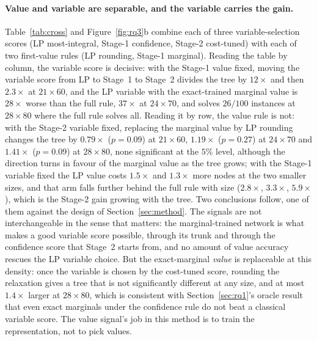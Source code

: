 \documentclass[final,5p,times,twocolumn,authoryear]{elsarticle}
\begin{document}
\paragraph{Value and variable are separable, and the variable carries the gain.} Table~\ref{tab:cross} and Figure~\ref{fig:rq3}b combine each of three variable-selection scores (LP most-integral, Stage-1 confidence, Stage-2 cost-tuned) with each of two first-value rules (LP rounding, Stage-1 marginal). Reading the table by column, the variable score is decisive: with the Stage-1 value fixed, moving the variable score from LP to Stage~1 to Stage~2 divides the tree by $12\times$ and then $2.3\times$ at $21\times60$, and the LP variable with the exact-trained marginal value is $28\times$ worse than the full rule, $37\times$ at $24\times70$, and solves $26/100$ instances at $28\times80$ where the full rule solves all. Reading it by row, the value rule is not: with the Stage-2 variable fixed, replacing the marginal value by LP rounding changes the tree by $0.79\times$ ($p=0.09$) at $21\times60$, $1.19\times$ ($p=0.27$) at $24\times70$ and $1.41\times$ ($p=0.09$) at $28\times80$, none significant at the $5\%$ level, although the direction turns in favour of the marginal value as the tree grows; with the Stage-1 variable fixed the LP value costs $1.5\times$ and $1.3\times$ more nodes at the two smaller sizes, and that arm falls further behind the full rule with size ($2.8\times$, $3.3\times$, $5.9\times$), which is the Stage-2 gain growing with the tree.
Two conclusions follow, one of them against the design of Section~\ref{sec:method}. The signals are not interchangeable in the sense that matters: the marginal-trained network is what makes a good variable score possible, through its trunk and through the confidence score that Stage~2 starts from, and no amount of value accuracy rescues the LP variable choice. But the exact-marginal \emph{value} is replaceable at this density: once the variable is chosen by the cost-tuned score, rounding the relaxation gives a tree that is not significantly different at any size, and at most $1.4\times$ larger at $28\times80$, which is consistent with Section~\ref{sec:rq1}'s oracle result that even exact marginals under the confidence rule do not beat a classical variable score. The value signal's job in this method is to train the representation, not to pick values.
\end{document}
